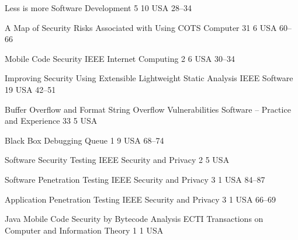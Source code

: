 \begin{thebibliography}{9}
		{}
		{Less is more}
		{Software Development}
		{5}
		{10}
		{USA}
		{}
		{28--34}
	
		{
			\biband
			}
		{A Map of Security Risks Associated with Using {COTS}}
		{Computer}
		{31}
		{6}
		{USA}
		{}
		{60--66}
	
		{
			\biband
			}
		{Mobile Code Security}
		{{IEEE} Internet Computing}
		{2}
		{6}
		{USA}
		{}
		{30--34}
	
		{
			\biband
			}
		{Improving Security Using Extensible Lightweight Static Analysis}
		{{IEEE} Software}
		{19}
		{}
		{USA}
		{}
		{42--51}
	
		{
			\biband
			}
		{Buffer Overflow and Format String Overflow Vulnerabilities}
		{Software -- Practice and Experience}
		{33}
		{5}
		{USA}
		{}
		{}
	
		{
			\biband
			}
		{Black Box Debugging}
		{Queue}
		{1}
		{9}
		{USA}
		{}
		{68--74}
	
		{
			\biband
			}
		{Software Security Testing}
		{{IEEE} Security and Privacy}
		{2}
		{5}
		{USA}
		{}
		{}
	
		{
			\biband
			\biband
			}
		{Software Penetration Testing}
		{{IEEE} Security and Privacy}
		{3}
		{1}
		{USA}
		{}
		{84--87}
	
		{}
		{Application Penetration Testing}
		{{IEEE} Security and Privacy}
		{3}
		{1}
		{USA}
		{}
		{66--69}
	
		{
			\biband
			\biband
			\biband
			}
		{Java Mobile Code Security by Bytecode Analysis}
		{{ECTI} Transactions on Computer and Information Theory}
		{1}
		{1}
		{USA}
		{}
		{}
	

\end{thebibliography}
